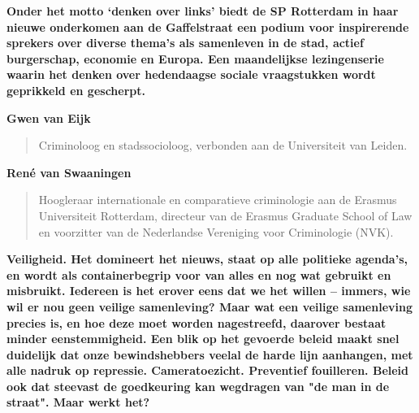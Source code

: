 \documentclass{article}
\begin{document}


\vfill

\textbf{Onder het motto `denken over links' biedt de SP Rotterdam in haar
nieuwe onderkomen aan de Gaffelstraat een podium voor inspirerende sprekers
over diverse thema's als samenleven in de stad, actief burgerschap, economie en
Europa. Een maandelijkse lezingenserie waarin het denken over hedendaagse
sociale vraagstukken wordt geprikkeld en gescherpt.}

\vfill


\vfill

\textbf{\large Gwen van Eijk}
\begin{quote}
  Criminoloog en stadssocioloog, verbonden aan de
  Universiteit van Leiden.
\end{quote}

\vfill

\textbf{\large Ren\'e van Swaaningen}
\begin{quote}
  Hoogleraar internationale en comparatieve
  criminologie aan de Erasmus Universiteit Rotterdam,
  directeur van de Erasmus Graduate School of Law en
  voorzitter van de Nederlandse Vereniging voor
  Criminologie (NVK).
\end{quote}

\vfill


\newpage


\vfill

\textbf{Veiligheid. Het domineert het nieuws, staat op
alle politieke agenda's, en wordt als containerbegrip
voor van alles en nog wat gebruikt en misbruikt.
Iedereen is het erover eens dat we het willen --
immers, wie wil er nou geen veilige samenleving? Maar
wat een veilige samenleving precies is, en hoe deze
moet worden nagestreefd, daarover bestaat minder
eenstemmigheid. Een blik op het gevoerde beleid maakt
snel duidelijk dat onze bewindshebbers veelal de harde
lijn aanhangen, met alle nadruk op repressie.
Cameratoezicht. Preventief fouilleren. Beleid ook dat
steevast de goedkeuring kan wegdragen van "de man in de
straat". Maar werkt het?}
\end{document}
